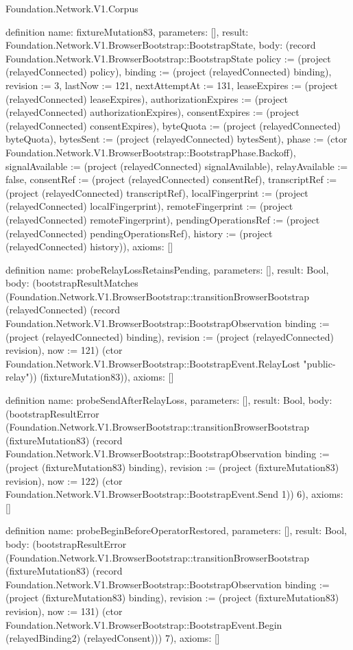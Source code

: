 \begin{lexlean}{Foundation.Network.V1.Corpus}
\begin{semanticmodule}
definition{
  name: fixtureMutation83,
  parameters: [],
  result: Foundation.Network.V1.BrowserBootstrap::BootstrapState,
  body: (record Foundation.Network.V1.BrowserBootstrap::BootstrapState {policy := (project (relayedConnected) policy), binding := (project (relayedConnected) binding), revision := 3, lastNow := 121, nextAttemptAt := 131, leaseExpires := (project (relayedConnected) leaseExpires), authorizationExpires := (project (relayedConnected) authorizationExpires), consentExpires := (project (relayedConnected) consentExpires), byteQuota := (project (relayedConnected) byteQuota), bytesSent := (project (relayedConnected) bytesSent), phase := (ctor Foundation.Network.V1.BrowserBootstrap::BootstrapPhase.Backoff), signalAvailable := (project (relayedConnected) signalAvailable), relayAvailable := false, consentRef := (project (relayedConnected) consentRef), transcriptRef := (project (relayedConnected) transcriptRef), localFingerprint := (project (relayedConnected) localFingerprint), remoteFingerprint := (project (relayedConnected) remoteFingerprint), pendingOperationsRef := (project (relayedConnected) pendingOperationsRef), history := (project (relayedConnected) history)}),
  axioms: []
}

definition{
  name: probeRelayLossRetainsPending,
  parameters: [],
  result: Bool,
  body: (bootstrapResultMatches (Foundation.Network.V1.BrowserBootstrap::transitionBrowserBootstrap (relayedConnected) (record Foundation.Network.V1.BrowserBootstrap::BootstrapObservation {binding := (project (relayedConnected) binding), revision := (project (relayedConnected) revision), now := 121}) (ctor Foundation.Network.V1.BrowserBootstrap::BootstrapEvent.RelayLost "public-relay")) (fixtureMutation83)),
  axioms: []
}

definition{
  name: probeSendAfterRelayLoss,
  parameters: [],
  result: Bool,
  body: (bootstrapResultError (Foundation.Network.V1.BrowserBootstrap::transitionBrowserBootstrap (fixtureMutation83) (record Foundation.Network.V1.BrowserBootstrap::BootstrapObservation {binding := (project (fixtureMutation83) binding), revision := (project (fixtureMutation83) revision), now := 122}) (ctor Foundation.Network.V1.BrowserBootstrap::BootstrapEvent.Send 1)) 6),
  axioms: []
}

definition{
  name: probeBeginBeforeOperatorRestored,
  parameters: [],
  result: Bool,
  body: (bootstrapResultError (Foundation.Network.V1.BrowserBootstrap::transitionBrowserBootstrap (fixtureMutation83) (record Foundation.Network.V1.BrowserBootstrap::BootstrapObservation {binding := (project (fixtureMutation83) binding), revision := (project (fixtureMutation83) revision), now := 131}) (ctor Foundation.Network.V1.BrowserBootstrap::BootstrapEvent.Begin (relayedBinding2) (relayedConsent))) 7),
  axioms: []
}


\end{semanticmodule}
\end{lexlean}
